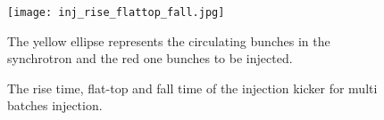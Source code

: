 \begin{figure}[!htb]
   \centering   
   \texttt{[image: inj\_rise\_flattop\_fall.jpg]}
   \caption{The rise time, flat-top and fall time of the injection kicker for multi batches injection.}{The yellow ellipse represents the circulating bunches in the synchrotron and the red one bunches to be injected.}
   \label{inj_rise_flattop_fall}
\end{figure}

%


%
%


